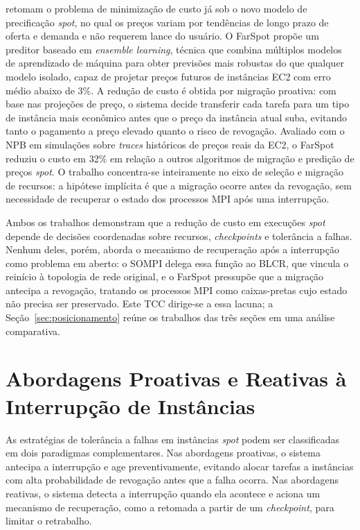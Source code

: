  retomam o problema de minimização de custo já
sob o novo modelo de precificação \textit{spot}, no qual os preços variam por
tendências de longo prazo de oferta e demanda e não requerem lance do usuário.
O FarSpot propõe um preditor baseado em \textit{ensemble learning}, técnica
que combina múltiplos modelos de aprendizado de máquina para obter previsões
mais robustas do que qualquer modelo isolado, capaz de projetar preços futuros
de instâncias EC2 com erro médio abaixo de 3\%. A redução de custo é obtida
por migração proativa: com base nas projeções de preço, o sistema decide
transferir cada tarefa para um tipo de instância mais econômico antes que o
preço da instância atual suba, evitando tanto o pagamento a preço elevado
quanto o risco de revogação. Avaliado com o NPB em simulações sobre
\textit{traces} históricos de preços reais da EC2, o FarSpot reduziu o custo
em 32\% em relação a outros algoritmos de migração e predição de preços
\textit{spot}. O trabalho concentra-se inteiramente no eixo de seleção e
migração de recursos: a hipótese implícita é que a migração ocorre antes da
revogação, sem necessidade de recuperar o estado dos processos MPI após uma
interrupção.

Ambos os trabalhos demonstram que a redução de custo em execuções \textit{spot}
depende de decisões coordenadas sobre recursos, \textit{checkpoints} e
tolerância a falhas. Nenhum deles, porém, aborda o mecanismo de recuperação
após a interrupção como problema em aberto: o SOMPI delega essa função ao
BLCR, que vincula o reinício à topologia de rede original, e o FarSpot
pressupõe que a migração antecipa a revogação, tratando os processos MPI como
caixas-pretas cujo estado não precisa ser preservado. Este TCC dirige-se a
essa lacuna; a Seção~\ref{sec:posicionamento} reúne os trabalhos das três
seções em uma análise comparativa.

\section{Abordagens Proativas e Reativas à Interrupção de Instâncias}
\label{sec:rel-confiabilidade}

As estratégias de tolerância a falhas em instâncias \textit{spot} podem ser
classificadas em dois paradigmas complementares. Nas abordagens proativas, o
sistema antecipa a interrupção e age preventivamente, evitando alocar tarefas a
instâncias com alta probabilidade de revogação antes que a falha ocorra. Nas
abordagens reativas, o sistema detecta a interrupção quando ela acontece e aciona
um mecanismo de recuperação, como a retomada a partir de um \textit{checkpoint},
para limitar o retrabalho.

